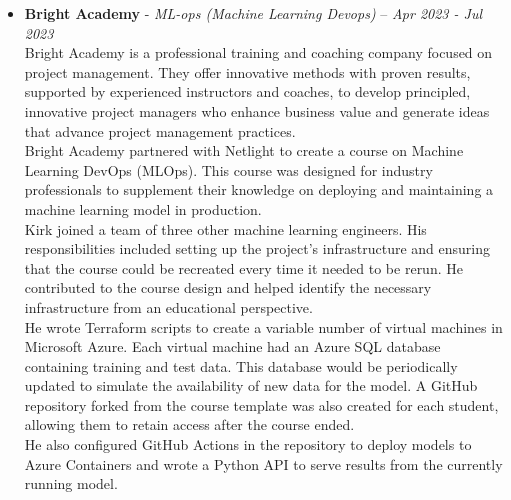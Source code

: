 \documentclass[10pt,letterpaper]{article}
\begin{document}
{\begin{itemize}[noitemsep,nolistsep]
			He took the initiative to create several tools for emulating the cloud solution locally. He developed a program for dynamically creating Pub/Sub topics and subscriptions, allowing developers to run the entire event-driven architecture locally. Due to limitations with third-party integrations, he implemented a tagging system similar to Kafka. \\

		\item \textbf{Bright Academy} - {\it ML-ops (Machine Learning Devops)} -- {\it Apr 2023 - Jul 2023} \\

			Bright Academy is a professional training and coaching company focused on project management. They offer innovative methods with proven results, supported by experienced instructors and coaches, to develop principled, innovative project managers who enhance business value and generate ideas that advance project management practices. \\

			Bright Academy partnered with Netlight to create a course on Machine Learning DevOps (MLOps). This course was designed for industry professionals to supplement their knowledge on deploying and maintaining a machine learning model in production. \\

			Kirk joined a team of three other machine learning engineers. His responsibilities included setting up the project's infrastructure and ensuring that the course could be recreated every time it needed to be rerun. He contributed to the course design and helped identify the necessary infrastructure from an educational perspective. \\

			He wrote Terraform scripts to create a variable number of virtual machines in Microsoft Azure. Each virtual machine had an Azure SQL database containing training and test data. This database would be periodically updated to simulate the availability of new data for the model. A GitHub repository forked from the course template was also created for each student, allowing them to retain access after the course ended. \\

			He also configured GitHub Actions in the repository to deploy models to Azure Containers and wrote a Python API to serve results from the currently running model. \\

	\end{itemize}
}
\end{document}
